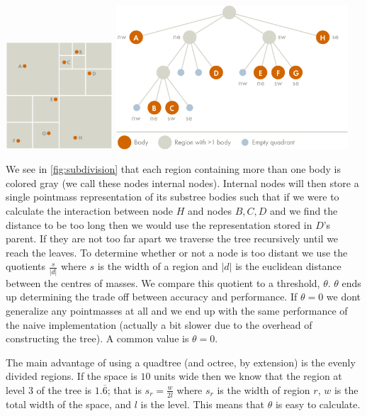 \begin{Figure}
  \centering
  \includegraphics[width=0.30\textwidth]{assests/example-space}
  \includegraphics[width=0.65\textwidth]{assests/example-tree}
  \label{fig:subdivision}
\end{Figure}

We see in \autoref{fig:subdivision} that each region containing more than one
body is colored gray (we call these nodes internal nodes). Internal nodes will
then store a single pointmass representation of its substree bodies such that if
we were to calculate the interaction between node $H$ and nodes $B, C, D$ and we
find the distance to be too long then we would use the representation stored in
$D$'s parent. If they are not too far apart we traverse the tree recursively
until we reach the leaves. To determine whether or not a node is too distant we
use the quotients $\frac{s}{|d|}$ where $s$ is the width of a region and $|d|$
is the euclidean distance between the centres of masses. We compare this
quotient to a threshold, $\theta$. $\theta$ ends up determining the trade off
between accuracy and performance. If $\theta = 0$ we dont generalize any
pointmasses at all and we end up with the same performance of the naive
implementation (actually a bit slower due to the overhead of constructing the
tree). A common value is $\theta = 0$.

The main advantage of using a quadtree (and octree, by extension) is the evenly
divided regions. If the space is $10$ units wide then we know that the region at
level $3$ of the tree is $1.\overline{6}$; that is $s_r=\frac{w}{2l}$ where
$s_r$ is the width of region $r$, $w$ is the total width of the space, and $l$
is the level. This means that $\theta$ is easy to calculate.

